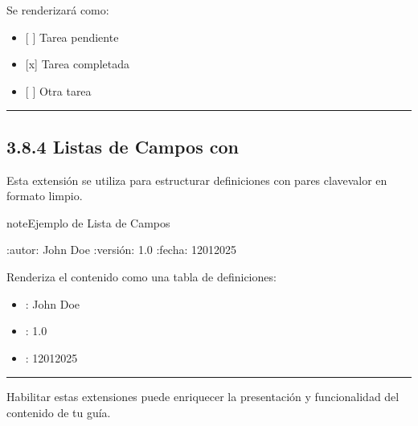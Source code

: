\documentclass[a4paper,10pt,spanish]{sphinxmanual}
\begin{document}
\sphinxAtStartPar
Se renderizará como:
\begin{itemize}
\item {} 
\sphinxAtStartPar
{[} {]} Tarea pendiente

\item {} 
\sphinxAtStartPar
{[}x{]} Tarea completada

\item {} 
\sphinxAtStartPar
{[} {]} Otra tarea

\end{itemize}


\bigskip\hrule\bigskip



\subsection{3.8.4 Listas de Campos con }
\label{\detokenize{3_guia_myst/extensiones:listas-de-campos-con-fieldlist}}
\sphinxAtStartPar
Esta extensión se utiliza para estructurar definiciones con pares clave\sphinxhyphen{}valor en formato limpio.

\begin{sphinxadmonition}{note}{Ejemplo de Lista de Campos}

\begin{sphinxVerbatim}[commandchars=\\\{\}]
:autor: John Doe
:versión: 1.0
:fecha: 12\PYGZhy{}01\PYGZhy{}2025
\end{sphinxVerbatim}
\end{sphinxadmonition}

\sphinxAtStartPar
Renderiza el contenido como una tabla de definiciones:
\begin{itemize}
\item {} 
\sphinxAtStartPar
{}: John Doe

\item {} 
\sphinxAtStartPar
{}: 1.0

\item {} 
\sphinxAtStartPar
{}: 12\sphinxhyphen{}01\sphinxhyphen{}2025

\end{itemize}


\bigskip\hrule\bigskip


\sphinxAtStartPar
Habilitar estas extensiones puede enriquecer la presentación y funcionalidad del contenido de tu guía.

\sphinxstepscope
\end{document}
